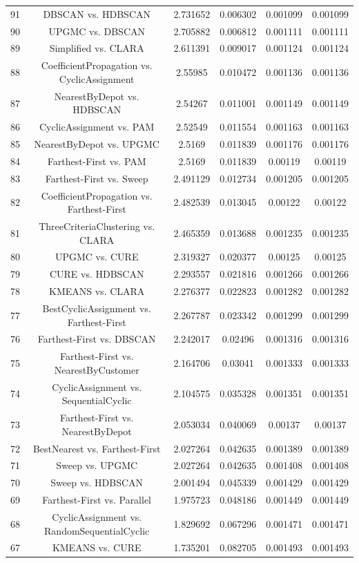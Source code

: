 \documentclass[a4paper,10pt]{article}
\begin{document}
\begin{landscape}
\begin{table}[!htp]
\begin{tabular}{cccccc}
91&DBSCAN vs. HDBSCAN&2.731652&0.006302&0.001099&0.001099\\
90&UPGMC vs. DBSCAN&2.705882&0.006812&0.001111&0.001111\\
89&Simplified vs. CLARA&2.611391&0.009017&0.001124&0.001124\\
88&CoefficientPropagation vs. CyclicAssignment&2.55985&0.010472&0.001136&0.001136\\
87&NearestByDepot vs. HDBSCAN&2.54267&0.011001&0.001149&0.001149\\
86&CyclicAssignment vs. PAM&2.52549&0.011554&0.001163&0.001163\\
85&NearestByDepot vs. UPGMC&2.5169&0.011839&0.001176&0.001176\\
84&Farthest-First vs. PAM&2.5169&0.011839&0.00119&0.00119\\
83&Farthest-First vs. Sweep&2.491129&0.012734&0.001205&0.001205\\
82&CoefficientPropagation vs. Farthest-First&2.482539&0.013045&0.00122&0.00122\\
81&ThreeCriteriaClustering vs. CLARA&2.465359&0.013688&0.001235&0.001235\\
80&UPGMC vs. CURE&2.319327&0.020377&0.00125&0.00125\\
79&CURE vs. HDBSCAN&2.293557&0.021816&0.001266&0.001266\\
78&KMEANS vs. CLARA&2.276377&0.022823&0.001282&0.001282\\
77&BestCyclicAssignment vs. Farthest-First&2.267787&0.023342&0.001299&0.001299\\
76&Farthest-First vs. DBSCAN&2.242017&0.02496&0.001316&0.001316\\
75&Farthest-First vs. NearestByCustomer&2.164706&0.03041&0.001333&0.001333\\
74&CyclicAssignment vs. SequentialCyclic&2.104575&0.035328&0.001351&0.001351\\
73&Farthest-First vs. NearestByDepot&2.053034&0.040069&0.00137&0.00137\\
72&BestNearest vs. Farthest-First&2.027264&0.042635&0.001389&0.001389\\
71&Sweep vs. UPGMC&2.027264&0.042635&0.001408&0.001408\\
70&Sweep vs. HDBSCAN&2.001494&0.045339&0.001429&0.001429\\
69&Farthest-First vs. Parallel&1.975723&0.048186&0.001449&0.001449\\
68&CyclicAssignment vs. RandomSequentialCyclic&1.829692&0.067296&0.001471&0.001471\\
67&KMEANS vs. CURE&1.735201&0.082705&0.001493&0.001493\\

\end{tabular}
\end{table}
\end{landscape}
\end{document}
